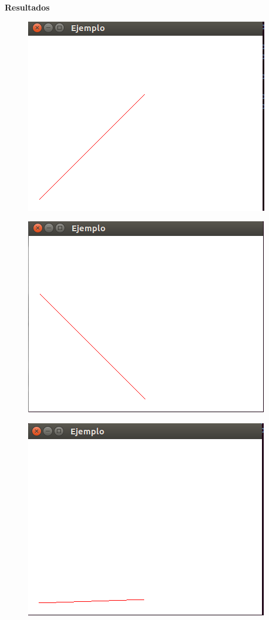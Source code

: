 \documentclass[a4paper,12pt]{article}
\begin{document}
\begin{large}
 \textbf{Resultados}
\end{large}

\begin{figure}[H]
 \centering
 \includegraphics[scale = 0.5]{1.png}
\end{figure}
\begin{figure}[H]
 \centering
 \includegraphics[scale = 0.5]{2.png}
\end{figure}
\begin{figure}[H]
 \centering
 \includegraphics[scale = 0.5]{3.png}
\end{figure}
\end{document}
